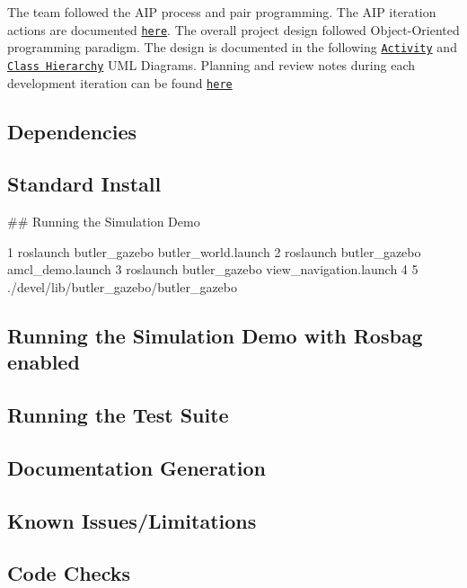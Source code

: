 The team followed the A\+IP process and pair programming. The A\+IP iteration actions are documented \href{https://docs.google.com/spreadsheets/d/1O8GisJ7VpNulYqH-gaPCvG_NAVHMwOyPO4F18fhpBL4/edit?ts=5ddb0c09#gid=0}{\tt here}. The overall project design followed Object-\/\+Oriented programming paradigm. The design is documented in the following \href{./UML/initial/ActivityDiagram.pdf/}{\tt Activity} and \href{./UML/initial/ClassDiagram.pdf}{\tt Class Hierarchy} U\+ML Diagrams. Planning and review notes during each development iteration can be found \href{https://docs.google.com/document/u/0/d/1aiRbswW5R_R5Iiowr5hDhnN0nU_4OwQu9OM1Oh6o9Pk/mobilebasic}{\tt here}

\subsection*{Dependencies}

\subsection*{Standard Install}

\#\# Running the Simulation Demo 
\begin{DoxyCode}
1 roslaunch butler\_gazebo butler\_world.launch 
2 roslaunch butler\_gazebo amcl\_demo.launch
3 roslaunch butler\_gazebo view\_navigation.launch
4 
5 ./devel/lib/butler\_gazebo/butler\_gazebo
\end{DoxyCode}
 \subsection*{Running the Simulation Demo with Rosbag enabled}

\subsection*{Running the Test Suite}

\subsection*{Documentation Generation}

\subsection*{Known Issues/\+Limitations}

\subsection*{Code Checks}

